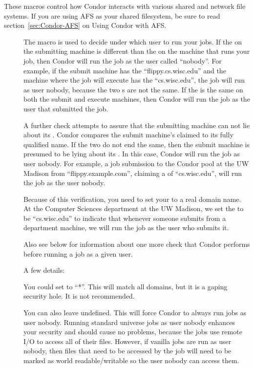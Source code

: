 These macros control how Condor interacts with various shared and
network file systems.  If you are using AFS as your shared filesystem,
be sure to read section~\ref{sec:Condor-AFS} on Using Condor with
AFS.
\begin{description}

\item[] \label{param:UidDomain}
The  macro
is used to decide under which user to run your jobs.
If the 
on the submitting machine is different than
the 
on the machine that runs your job, then Condor will run
the job as the user called ``nobody''.
For example, if the submit machine has
the 
``flippy.cs.wisc.edu'' and the machine where the job will execute
has the 
``cs.wisc.edu'', the job will run as user nobody, because
the two s are not the same.
If the 
is the same on both the submit and execute machines,
then Condor will run the job as the user that submitted the job.

A further check attempts to assure that the submitting
machine can not lie about its .
Condor compares the 
submit machine's claimed 
to its fully qualified name.
If the two do not end the same, then the submit machine
is presumed to be lying about its .
In this case, Condor will run the job as user nobody.
For example, a job submission to the Condor pool at the UW Madison
from ``flippy.example.com'', claiming a 
of ``cs.wisc.edu'',
will run the job as the user nobody.

Because of this verification, you need to set your
to a real domain name. At the Computer Sciences department
at the UW Madison, we set the 
to be ``cs.wisc.edu'' to
indicate that whenever someone submits from a department machine, we
will run the job as the user who submits it.

Also see 
below for information about one more check
that Condor performs before running a job as a given user.

A few details:

You could set 
to ``*''. This will match all domains,
but it is a gaping security hole. It is not recommended.

You can also leave  undefined. This will
force Condor to always run jobs as user nobody.
Running standard universe jobs as user nobody enhances
your security and should cause no problems, because the jobs use remote
I/O to access all of their files.
However, if vanilla jobs are run as
user nobody, then files that need to be accessed by the job will need
to be marked as world readable/writable so the user nobody can access
them.


\end{description}
